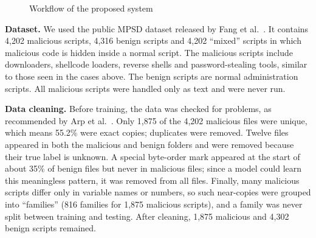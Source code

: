 \documentclass[12pt,a4paper]{article}
\newcommand{\head}[1]{\noindent\textbf{#1}\quad}
\begin{document}
\begin{figure}[htbp]
\centering
{}
\caption{Workflow of the proposed system}\label{fig:flow}
\end{figure}

\head{Dataset.} We used the public MPSD dataset released by Fang et al.~\cite{fang2021}. It contains 4,202 malicious scripts, 4,316 benign scripts and 4,202 ``mixed'' scripts in which malicious code is hidden inside a normal script. The malicious scripts include downloaders, shellcode loaders, reverse shells and password-stealing tools, similar to those seen in the cases above. The benign scripts are normal administration scripts. All malicious scripts were handled only as text and were never run.

\head{Data cleaning.} Before training, the data was checked for problems, as recommended by Arp et al.~\cite{arp2022}. Only 1,875 of the 4,202 malicious files were unique, which means 55.2\% were exact copies; duplicates were removed. Twelve files appeared in both the malicious and benign folders and were removed because their true label is unknown. A special byte-order mark appeared at the start of about 35\% of benign files but never in malicious files; since a model could learn this meaningless pattern, it was removed from all files. Finally, many malicious scripts differ only in variable names or numbers, so such near-copies were grouped into ``families'' (816 families for 1,875 malicious scripts), and a family was never split between training and testing. After cleaning, 1,875 malicious and 4,302 benign scripts remained.
\end{document}
